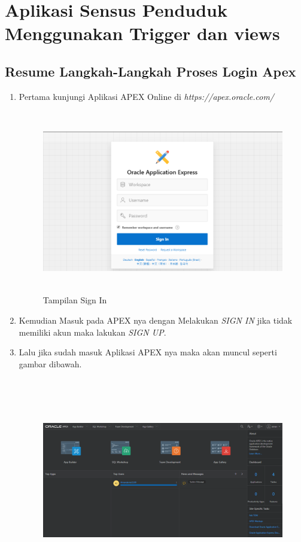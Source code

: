 \chapter{Aplikasi Sensus Penduduk Menggunakan Trigger dan views}
\section{Resume Langkah-Langkah Proses Login Apex}
\par
\begin{enumerate}
    \item Pertama kunjungi Aplikasi APEX Online di \textit{https://apex.oracle.com/} 
    \begin{figure}[!htbp]
    \centering
    \includegraphics[width=13cm,height=8cm]{figures/awal.PNG}
    \caption{Tampilan Sign In}
    \label{penanda}
    \end{figure}
    \item Kemudian Masuk pada APEX nya dengan Melakukan \textit{SIGN IN} jika tidak memiliki akun maka lakukan \textit{SIGN UP}.
    \item Lalu jika sudah masuk Aplikasi APEX nya maka akan muncul seperti gambar dibawah.
\begin{figure}[!htbp]
\centering
\includegraphics[width=13cm,height=9cm]{figures/awal1.PNG}

\end{figure}
\end{enumerate}
